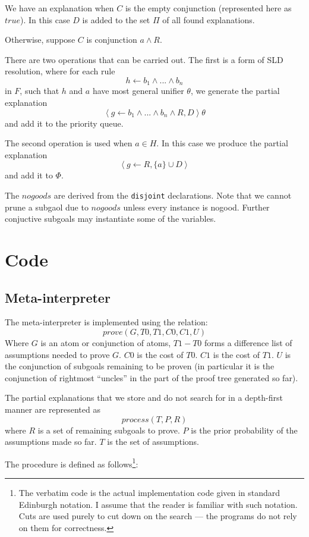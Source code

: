 We have an explanation when $C$ is the empty conjunction (represented
here as $true$). In this case $D$ is added to the set $\Pi$ of all
found explanations.

Otherwise,
suppose $C$ is conjunction $a \wedge R$.

There are two operations that can be carried out. The first is a form of SLD
resolution, where 
for each rule
\[h \leftarrow b_1 \wedge ... \wedge b_n\]
in $F$, such that $h$ and $a$ have most general unifier $\theta$,  we
generate the partial explanation 
\[\left<g \leftarrow b_1 \wedge ... \wedge b_n \wedge R , D\right>\theta\]
and add it to the priority queue.

The second operation is used when $a \in H$. In this case we produce the
partial explanation
\[\left<g \leftarrow R , \{a\} \cup D\right>\]
and add it to $\Phi$.

The $nogoods$ are derived from the {\tt disjoint} declarations.
Note that we cannot prune a subgaol due to $nogoods$ unless every instance is nogood. Further conjuctive subgoals may instantiate some of the variables.

\section{Code}
\subsection{Meta-interpreter}
The meta-interpreter is implemented using the relation:
\[prove(G,T0,T1,C0,C1,U)\]
Where $G$ is an atom or conjunction of atoms,
$T1-T0$ forms a difference list of assumptions needed to prove
$G$.  $C0$ is the cost of $T0$. $C1$ is the cost of $T1$. $U$ is the
conjunction of subgoals remaining to be proven (in particular it is
the conjunction of rightmost ``uncles'' in the part of the proof tree
generated so far).

The partial explanations that we store and do not search for in a
depth-first manner are represented as
\[process(T,P,R)\]
where $R$ is a set of remaining subgoals to prove. $P$ is the
prior probability of the assumptions made so far. $T$ is the set
of assumptions.

The procedure is defined as follows\footnote{The verbatim code
is the actual implementation code given in standard Edinburgh notation.
I assume that the reader is familiar with such notation. Cuts are used
purely to cut down on the search --- the programs do not rely on them
for correctness.}:

